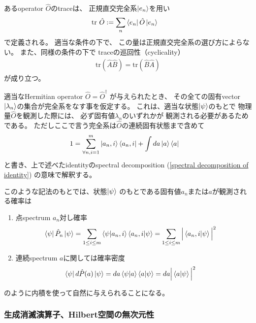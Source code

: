 あるoperator $\hat{O}$のtraceは、
正規直交完全系$\ket{e_n}$を用い
\begin{align}
    \mathrm{tr}\ \hat{O}
    &:=
    \sum_n\bra{e_n} \hat{O} \ket{e_n}
\end{align}
で定義される。
適当な条件の下で、
この量は正規直交完全系の選び方によらない。
また、同様の条件の下で
traceの巡回性（cyclicality）
\begin{align}
    \mathrm{tr}\left(
        \hat{A}\hat{B}
    \right)
    =
    \mathrm{tr}\left(
        \hat{B}\hat{A}
    \right)
\end{align}
が成り立つ。

適当なHermitian operator
$\hat{O} = \hat{O}^\dagger$
が与えられたとき、
その全ての固有vector
$\ket{\lambda_n}$の集合が完全系をなす事を仮定する。
これは、適当な状態$\ket{\psi}$のもとで
物理量$\hat{O}$を観測した際には、
必ず固有値$\lambda_n$のいずれかが
観測される必要があるためである。
ただしここで言う完全系は$\hat{O}$の連続固有状態まで含めて
\begin{align}
    1&=
    \sum_{\forall n,i=1}^m \ket{a_n,i}\bra{a_n,i}
    +
    \int da \ket{a}\bra{a}
\end{align}
と書き、上で述べたidentityのspectral decomposition
(\ref{spectral decomposition of identity})
の意味で解釈する。

このような記法のもとでは、状態$\ket{\psi}$
のもとである固有値$a_n$または$a$が観測される確率は
\begin{enumerate}
    \item{点spectrum $a_n$対し確率
    \begin{align}
        \bra{\psi} \hat{P}_n \ket{\psi}
        &=
            \sum_{1\le i \le m}
        \braket{\psi | a_n,i}
        \braket{a_n,i | \psi}
        =
            \sum_{1\le i \le m}
            \Big|
                \braket{a_n,i | \psi}
            \Big|^2
    \end{align}
    }
    \item{連続spectrum $a$に関しては確率密度
    \begin{align}
        \bra{\psi} d \hat{P}(a) \ket{\psi}
        &=
        da \braket{\psi | a}\braket{a | \psi}
    =
        da
            \Big|
                \braket{a | \psi}
            \Big|^2
    \end{align}
    }
\end{enumerate}
のように内積を使って自然に与えられることになる。

\subsubsection{生成消滅演算子、Hilbert空間の無次元性}

